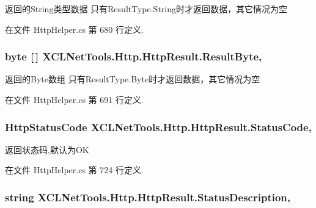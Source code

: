 返回的\-String类型数据 只有\-Result\-Type.\-String时才返回数据，其它情况为空 



在文件 Http\-Helper.\-cs 第 680 行定义.

\hypertarget{class_x_c_l_net_tools_1_1_http_1_1_http_result_aca3f63e730af7bb4c40a345fc5d02423}{
\subsubsection[{Result\-Byte}]{\setlength{\rightskip}{0pt plus 5cm}byte \mbox{[}$\,$\mbox{]} X\-C\-L\-Net\-Tools.\-Http.\-Http\-Result.\-Result\-Byte\hspace{0.3cm}{\ttfamily [get]}, {\ttfamily [set]}}}\label{class_x_c_l_net_tools_1_1_http_1_1_http_result_aca3f63e730af7bb4c40a345fc5d02423}


返回的\-Byte数组 只有\-Result\-Type.\-Byte时才返回数据，其它情况为空 



在文件 Http\-Helper.\-cs 第 691 行定义.

\hypertarget{class_x_c_l_net_tools_1_1_http_1_1_http_result_a2790d609062ed072dbc4a40a82d9f32c}{
\subsubsection[{Status\-Code}]{\setlength{\rightskip}{0pt plus 5cm}Http\-Status\-Code X\-C\-L\-Net\-Tools.\-Http.\-Http\-Result.\-Status\-Code\hspace{0.3cm}{\ttfamily [get]}, {\ttfamily [set]}}}\label{class_x_c_l_net_tools_1_1_http_1_1_http_result_a2790d609062ed072dbc4a40a82d9f32c}


返回状态码,默认为\-O\-K 



在文件 Http\-Helper.\-cs 第 724 行定义.

\hypertarget{class_x_c_l_net_tools_1_1_http_1_1_http_result_a365c2a2bd1deb98cde343b1123752d9c}{
\subsubsection[{Status\-Description}]{\setlength{\rightskip}{0pt plus 5cm}string X\-C\-L\-Net\-Tools.\-Http.\-Http\-Result.\-Status\-Description\hspace{0.3cm}{\ttfamily [get]}, {\ttfamily [set]}}}\label{class_x_c_l_net_tools_1_1_http_1_1_http_result_a365c2a2bd1deb98cde343b1123752d9c}


